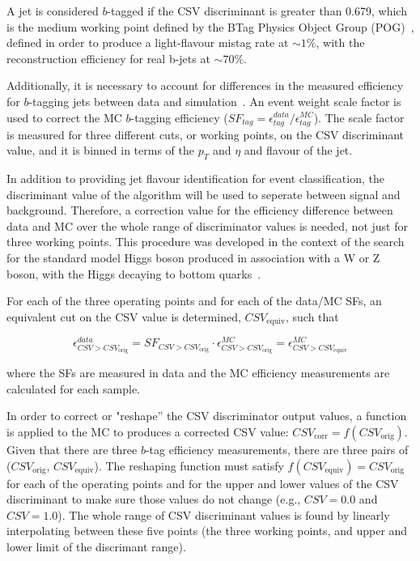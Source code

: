 \par A jet is considered $b$-tagged if the CSV discriminant is greater
than 0.679, which is the medium working point defined by the BTag
Physics Object Group (POG)~\cite{btagOP}, defined in order to produce
a light-flavour mistag rate at $\sim1\%$, with the reconstruction
efficiency for real b-jets at $\sim70\%$.  

\par Additionally, it is necessary to account for differences in the
measured efficiency for $b$-tagging jets between data and
simulation~\cite{CMS-PAS-BTV-11-004}.
An event weight scale factor is used to correct the MC $b$-tagging efficiency ($SF_{tag} =
\epsilon_{tag}^{data}/\epsilon_{tag}^{MC}$).  The scale factor is
measured for three different cuts, or working points, on the CSV
discriminant value, and it is binned in terms of the $p_{T}$ and
$\eta$ and flavour of the jet.  

\par In addition to providing jet flavour identification for event
classification, the discriminant value of the algorithm will be used
to seperate between \ttH signal and \ttjets background.  Therefore, a
correction value for the efficiency difference between data and MC over the whole range
of discriminator values is needed, not just for three working points.
This procedure was developed in the context of the search for the
standard model Higgs boson produced in association with a W or Z
boson, with the Higgs decaying to bottom
quarks~\cite{CMS-AN-2012-181}.  

\par For each of the three operating points and for each of the
data/MC SFs, an equivalent cut on the CSV value is determined,
\(CSV_{\mathrm{equiv}}\), such that 

\begin{equation}\label{eq:csv_reweight}
\epsilon^{data}_{CSV>CSV_{\mathrm{orig}}} = SF_{CSV>CSV_{\mathrm{orig}}}\cdot\epsilon^{MC}_{CSV>CSV_{\mathrm{orig}}} = \epsilon^{MC}_{CSV>CSV_{\mathrm{equiv}}}
\end{equation}

\noindent where the SFs are measured in data and the MC efficiency
measurements are calculated for each sample.

\par In order to correct or "reshape'' the CSV discriminator output
values, a function is applied to the MC to produces a corrected CSV value:
$CSV_{\mathrm{corr}}=f(CSV_{\mathrm{orig}})$.  Given that there are
three $b$-tag efficiency measurements, there are three pairs of
($CSV_{\mathrm{orig}}$, $CSV_{\mathrm{equiv}}$). The reshaping
function must satisfy $f(CSV_{\mathrm{equiv}}) =
CSV_{\mathrm{orig}}$ for each of the operating points and for the upper
and lower values of the CSV discriminant to make sure those values do
not change (e.g., $CSV = 0.0$ and $CSV = 1.0$).  The whole range of
CSV discriminant values is found by linearly interpolating between
these five points (the three working points, and upper and lower limit
of the discrimant range).


